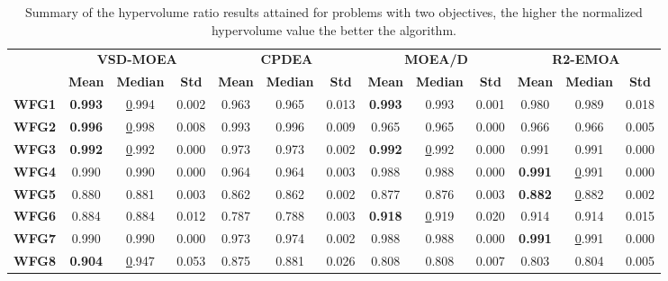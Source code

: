 \begin{table*}[t]
\caption{Summary of the hypervolume ratio results attained for problems with two objectives, the higher the normalized hypervolume value the better the algorithm.}
\label{tab:StatisticsHV_2obj}
\tiny 
\begin{tabular}{cc|c|c|c|c|c|c|c|c|c|c|c}
\cline{2-13}
\textbf{} & \multicolumn{3}{c|}{\textbf{VSD-MOEA}} & \multicolumn{3}{c|}{\textbf{CPDEA}} & \multicolumn{3}{c|}{\textbf{MOEA/D}} & \multicolumn{3}{c}{\textbf{R2-EMOA}} \\ \cline{2-13} 
\textbf{} & \textbf{Mean} & \textbf{Median} & \textbf{Std} & \textbf{Mean} & \textbf{Median} & \textbf{Std} & \textbf{Mean} & \textbf{Median} & \textbf{Std} & \textbf{Mean} & \textbf{Median} & \textbf{Std} \\ \hline
\multicolumn{1}{c|}{\textbf{WFG1}} & \textbf{0.993} & {\ul 0.994} & 0.002 & 0.963 & 0.965 & 0.013 & \textbf{0.993} & 0.993 & 0.001 & 0.980 & 0.989 & 0.018 \\ \hline
\multicolumn{1}{c|}{\textbf{WFG2}} & \textbf{0.996} & {\ul 0.998} & 0.008 & 0.993 & 0.996 & 0.009 & 0.965 & 0.965 & 0.000 & 0.966 & 0.966 & 0.005 \\ \hline
\multicolumn{1}{c|}{\textbf{WFG3}} & \textbf{0.992} & {\ul 0.992} & 0.000 & 0.973 & 0.973 & 0.002 & \textbf{0.992} & {\ul 0.992} & 0.000 & 0.991 & 0.991 & 0.000 \\ \hline
\multicolumn{1}{c|}{\textbf{WFG4}} & 0.990 & 0.990 & 0.000 & 0.964 & 0.964 & 0.003 & 0.988 & 0.988 & 0.000 & \textbf{0.991} & {\ul 0.991} & 0.000 \\ \hline
\multicolumn{1}{c|}{\textbf{WFG5}} & 0.880 & 0.881 & 0.003 & 0.862 & 0.862 & 0.002 & 0.877 & 0.876 & 0.003 & \textbf{0.882} & {\ul 0.882} & 0.002 \\ \hline
\multicolumn{1}{c|}{\textbf{WFG6}} & 0.884 & 0.884 & 0.012 & 0.787 & 0.788 & 0.003 & \textbf{0.918} & {\ul 0.919} & 0.020 & 0.914 & 0.914 & 0.015 \\ \hline
\multicolumn{1}{c|}{\textbf{WFG7}} & 0.990 & 0.990 & 0.000 & 0.973 & 0.974 & 0.002 & 0.988 & 0.988 & 0.000 & \textbf{0.991} & {\ul 0.991} & 0.000 \\ \hline
\multicolumn{1}{c|}{\textbf{WFG8}} & \textbf{0.904} & {\ul 0.947} & 0.053 & 0.875 & 0.881 & 0.026 & 0.808 & 0.808 & 0.007 & 0.803 & 0.804 & 0.005 \\ \hline

\end{tabular}
\end{table*}
